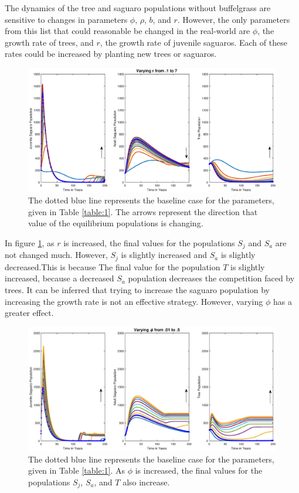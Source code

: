 \documentclass[a4paper]{article}
\begin{document}
The dynamics of the tree and saguaro populations without buffelgrass are sensitive to changes in parameters $\phi$, $\rho$, $b$, and $r$. However, the only parameters from this list that could reasonable be changed in the real-world are $\phi$, the growth rate of trees, and $r$, the growth rate of juvenile saguaros. Each of these rates could be increased by planting new trees or saguaros.

\begin{figure}[H]
\hspace{-1.5 cm}
\includegraphics[scale = 0.5]{VaryRNoBuffel.eps}
\caption{The dotted blue line represents the baseline case for the parameters, given in Table \ref{table:1}. The arrows represent the direction that value of the equilibrium populations is changing.}
\label{fig:VaryR}
\end{figure}
In figure \ref{fig:VaryR}, as $r$ is increased, the final values for the populations $S_j$ and $S_a$ are not changed much. However, $S_j$ is slightly increased and $S_a$ is slightly decreased.This is because The final value for the population $T$ is slightly increased, because a decreased $S_a$ population decreases the competition faced by trees. It can be inferred that trying to increase the saguaro population by increasing the growth rate is not an effective strategy. However, varying $\phi$ has a greater effect.
\begin{figure}[H]
\hspace{-1.5 cm}
\includegraphics[scale = 0.5]{VaryPhiNoBuffel.eps}
\caption{The dotted blue line represents the baseline case for the parameters, given in Table \ref{table:1}. As $\phi$ is increased, the final values for the populations $S_j$, $S_a$, and $T$ also increase.}
\label{fig:VaryPhi}
\end{figure}
\end{document}
